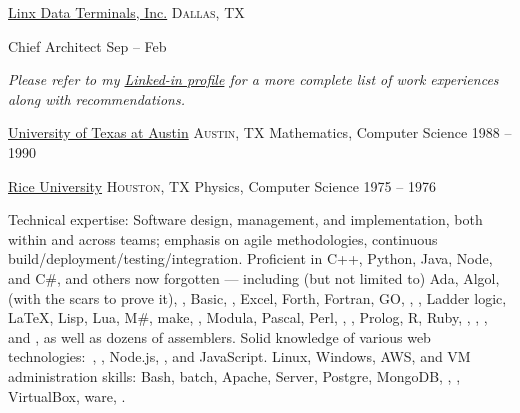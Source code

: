 \documentclass[10pt,letterpaper]{article}
\begin{document}
\vspace*{1em}
\headedsection
  {\href{http://www.linxdata.com/}{Linx Data Terminals, Inc.}}
  {\textsc{Dallas, TX}} {%

  \headedsubsection
    {Chief Architect}
    {Sep  -- Feb }
    {}
}

\vspace{-0.2em}
\begin{center}
  \emph{\small Please refer to my \href{http://www.linkedin.com/in/jfogarty}{Linked-in profile} for a more complete list of work experiences along with recommendations.}
\end{center}

\newpage

\spacedhrule{-0.2em}{-0.4em}


\headedsection
  {\href{https://www.utexas.edu/}{University of Texas at Austin}}
  {\textsc{Austin, TX}} {%
  \headedsubsection
    {Mathematics, Computer Science}
    {1988 -- 1990} {}
}

\headedsection
  {\href{http://www.rice.edu/}{Rice University}}
  {\textsc{Houston, TX}} {%
  \headedsubsection
    {Physics, Computer Science}
    {1975 -- 1976} {}
}


\spacedhrule{0.5em}{-0.4em}


\inlineheadsection  %
  {Technical expertise:}
  {Software design, management, and implementation, both within and across teams; emphasis on agile methodologies, continuous build/deployment/testing/integration.  
  Proficient in C++, Python, Java, Node, and C\#, and others now forgotten --- including (but not limited to) 
  Ada, Algol, \small{(with the scars to prove it)}, , Basic, , Excel, Forth, Fortran, GO, , , Ladder logic, \LaTeX, Lisp, Lua, M\#, make, , Modula, Pascal, Perl, , , Prolog, R, Ruby, , , , and , as well as dozens of assemblers.
  Solid knowledge of various web technologies:\ , , Node.js, ,  and JavaScript.
  Linux, Windows, AWS, and VM administration skills: Bash, batch, Apache,  Server, Postgre, MongoDB, , , VirtualBox, ware, .}
\end{document}
